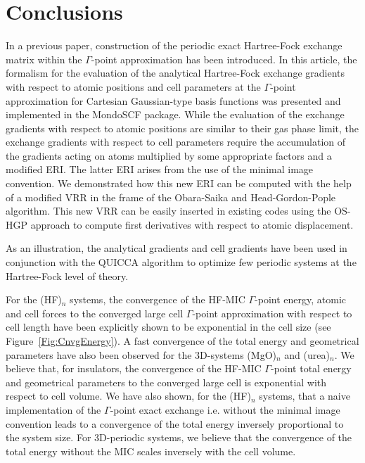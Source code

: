 \documentclass[prl,twocolumn,showpacs,twocolumngrid,superbib]{revtex4}
\begin{document}
\section{Conclusions}\label{Sec:Conclusions}

In a previous paper, construction of the periodic exact Hartree-Fock exchange 
matrix within the $\Gamma$-point approximation
has been introduced. In this article, the formalism for the evaluation of 
the analytical Hartree-Fock exchange gradients with respect 
to atomic positions and cell parameters at 
the $\Gamma$-point approximation for Cartesian Gaussian-type basis functions 
was presented and implemented in the {\sc MondoSCF} package. 
While the evaluation of the exchange gradients with respect to atomic positions are similar to their 
gas phase limit, the exchange gradients with respect to cell parameters require the accumulation of 
the gradients acting on atoms multiplied by some appropriate factors and a 
modified ERI. The latter ERI arises from the use of the minimal image convention. 
We demonstrated how this new ERI can be computed with the help of a modified VRR 
in the frame of the Obara-Saika and Head-Gordon-Pople algorithm. This new VRR can
be easily inserted in existing codes using the OS-HGP approach to compute 
first derivatives with respect to atomic displacement. 

As an illustration, the analytical gradients and cell gradients have been used 
in conjunction with the QUICCA algorithm to optimize few periodic systems at 
the Hartree-Fock level of theory. 

For the (HF)$_n$ systems, the convergence of the HF-MIC $\Gamma$-point energy, 
atomic and cell forces to the converged large cell $\Gamma$-point approximation
with respect to cell length have been explicitly shown to be exponential 
in the cell size (see Figure~\ref{Fig:CnvgEnergy}). 
A fast convergence of the total energy and geometrical parameters
have also been observed for the 3D-systems (MgO)$_n$ and (urea)$_n$. We believe
that, for insulators, the convergence of the HF-MIC $\Gamma$-point total energy 
and geometrical parameters to the converged large cell is exponential 
with respect to cell volume.
We have also shown, for the (HF)$_n$ systems, that a naive implementation of 
the $\Gamma$-point exact exchange i.e. without the minimal image convention 
leads to a convergence of the total energy inversely proportional to 
the system size. For 3D-periodic systems, we believe that the convergence 
of the total energy without the MIC scales inversely with the 
cell volume.
\end{document}
